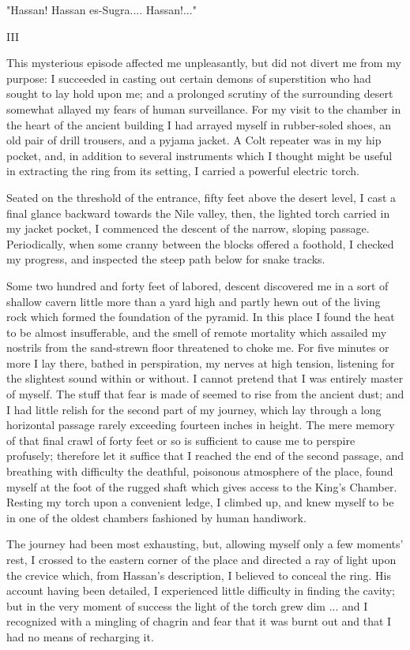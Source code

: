 "Hassan! Hassan es-Sugra.... Hassan!..."


III

This mysterious episode affected me unpleasantly, but did not divert
me from my purpose: I succeeded in casting out certain demons of
superstition who had sought to lay hold upon me; and a prolonged
scrutiny of the surrounding desert somewhat allayed my fears of human
surveillance. For my visit to the chamber in the heart of the ancient
building I had arrayed myself in rubber-soled shoes, an old pair of
drill trousers, and a pyjama jacket. A Colt repeater was in my hip
pocket, and, in addition to several instruments which I thought might
be useful in extracting the ring from its setting, I carried a
powerful electric torch.

Seated on the threshold of the entrance, fifty feet above the desert
level, I cast a final glance backward towards the Nile valley, then,
the lighted torch carried in my jacket pocket, I commenced the descent
of the narrow, sloping passage. Periodically, when some cranny between
the blocks offered a foothold, I checked my progress, and inspected
the steep path below for snake tracks.

Some two hundred and forty feet of labored, descent discovered me in
a sort of shallow cavern little more than a yard high and partly hewn
out of the living rock which formed the foundation of the pyramid.
In this place I found the heat to be almost insufferable, and the smell
of remote mortality which assailed my nostrils from the sand-strewn
floor threatened to choke me. For five minutes or more I lay there,
bathed in perspiration, my nerves at high tension, listening for the
slightest sound within or without. I cannot pretend that I was
entirely master of myself. The stuff that fear is made of seemed to
rise from the ancient dust; and I had little relish for the second
part of my journey, which lay through a long horizontal passage rarely
exceeding fourteen inches in height. The mere memory of that final
crawl of forty feet or so is sufficient to cause me to perspire
profusely; therefore let it suffice that I reached the end of the
second passage, and breathing with difficulty the deathful, poisonous
atmosphere of the place, found myself at the foot of the rugged shaft
which gives access to the King's Chamber. Resting my torch upon a
convenient ledge, I climbed up, and knew myself to be in one of the
oldest chambers fashioned by human handiwork.

The journey had been most exhausting, but, allowing myself only a few
moments' rest, I crossed to the eastern corner of the place and
directed a ray of light upon the crevice which, from Hassan's
description, I believed to conceal the ring. His account having been
detailed, I experienced little difficulty in finding the cavity; but
in the very moment of success the light of the torch grew dim ... and
I recognized with a mingling of chagrin and fear that it was burnt out
and that I had no means of recharging it.

